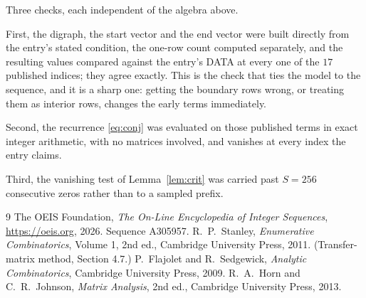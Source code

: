 \documentclass[11pt,a4paper]{article}
\theoremstyle{plain}
\theoremstyle{definition}
\begin{document}
Three checks, each independent of the algebra above.

First, the digraph, the start vector and the end vector were built directly from the
entry's stated condition, the one-row count computed separately, and the resulting values
compared against the entry's DATA at every one of the $17$ published indices; they
agree exactly. This is the check that ties the model to the sequence, and it is a sharp one:
getting the boundary rows wrong, or treating them as interior rows, changes the early terms
immediately.

Second, the recurrence \eqref{eq:conj} was evaluated on those published terms in exact
integer arithmetic, with no matrices involved, and vanishes at every index the entry claims.

Third, the vanishing test of Lemma~\ref{lem:crit} was carried past $S=256$ consecutive
zeros rather than to a sampled prefix.

\begin{thebibliography}{9}
 The OEIS Foundation, \emph{The On-Line Encyclopedia of Integer
Sequences}, \url{https://oeis.org}, 2026. Sequence A305957.
 R.~P.~Stanley, \emph{Enumerative Combinatorics}, Volume 1, 2nd ed.,
Cambridge University Press, 2011. (Transfer-matrix method, Section 4.7.)
 P.~Flajolet and R.~Sedgewick, \emph{Analytic Combinatorics}, Cambridge
University Press, 2009.
 R.~A.~Horn and C.~R.~Johnson, \emph{Matrix Analysis}, 2nd ed., Cambridge
University Press, 2013.
\end{thebibliography}
\end{document}
